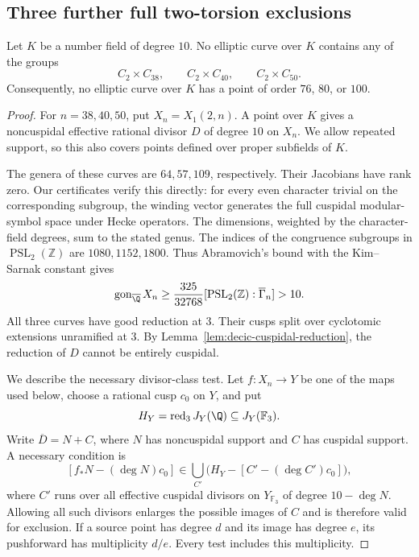 \subsection{Three further full two-torsion exclusions}
\begin{proposition}\label{prop:decic238-240-250}
Let $K$ be a number field of degree $10$. No elliptic curve over $K$
contains any of the groups
\[
 C_2\times C_{38},\qquad C_2\times C_{40},\qquad C_2\times C_{50}.
\]
Consequently, no elliptic curve over $K$ has a point of order
$76$, $80$, or $100$.
\end{proposition}
\begin{proof}
For $n=38,40,50$, put $X_n=X_1(2,n)$. A point over $K$ gives a
noncuspidal effective rational divisor $D$ of degree $10$ on $X_n$.
We allow repeated support, so this also covers points defined over
proper subfields of $K$.

The genera of these curves are $64,57,109$, respectively. Their
Jacobians have rank zero. Our certificates verify this directly:
for every even character trivial on the corresponding subgroup,
the winding vector generates the full cuspidal modular-symbol space
under Hecke operators. The dimensions, weighted by the character-field
degrees, sum to the stated genus. The indices of the congruence
subgroups in $\operatorname{PSL}_2(\mathbb Z)$ are $1080,1152,1800$.
Thus Abramovich's bound with the Kim--Sarnak constant gives
\[
 \operatorname{gon}_{\overline{\Q}}X_n
 \geq\frac{325}{32768}[\operatorname{PSL}_2(\mathbb Z):\overline\Gamma_n]
 >10.
\]
All three curves have good reduction at $3$. Their cusps split over
cyclotomic extensions unramified at $3$. By
Lemma~\ref{lem:decic-cuspidal-reduction}, the reduction of $D$ cannot
be entirely cuspidal.

We describe the necessary divisor-class test. Let $f:X_n\to Y$ be
one of the maps used below, choose a rational cusp $c_0$ on $Y$, and put
\[
 H_Y=\operatorname{red}_3 J_Y(\Q)\subseteq J_Y(\mathbb F_3).
\]
Write $\overline D=N+C$, where $N$ has noncuspidal support and $C$
has cuspidal support. A necessary condition is
\begin{equation}\label{eq:decic-small-picard}
 [f_*N-(\deg N)c_0]\in
 \bigcup_{C'}\bigl(H_Y-[C'-(\deg C')c_0]\bigr),
\end{equation}
where $C'$ runs over all effective cuspidal divisors on $Y_{\mathbb F_3}$
of degree $10-\deg N$. Allowing all such divisors enlarges the possible
images of $C$ and is therefore valid for exclusion. If a source point
has degree $d$ and its image has degree $e$, its pushforward has
multiplicity $d/e$. Every test includes this multiplicity.


\end{proof}
